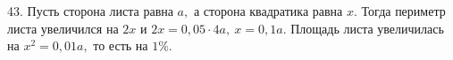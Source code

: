 43. Пусть сторона листа равна $a,$ а сторона квадратика равна $x.$ Тогда периметр листа увеличился на $2x$ и $2x=0,05\cdot4a,\ x=0,1a.$ Площадь листа увеличилась на $x^2=0,01a,$ то есть на $1\%.$\\
